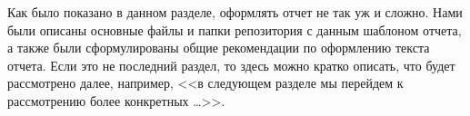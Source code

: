 Как было показано в данном разделе, оформлять отчет не так уж и сложно.
Нами были описаны основные файлы и папки репозитория с данным шаблоном отчета, а также были сформулированы общие рекомендации по оформлению текста отчета.
Если это не последний раздел, то здесь можно кратко описать, что будет рассмотрено далее, например, <<в следующем разделе мы перейдем к рассмотрению более конкретных \ldots>>.
